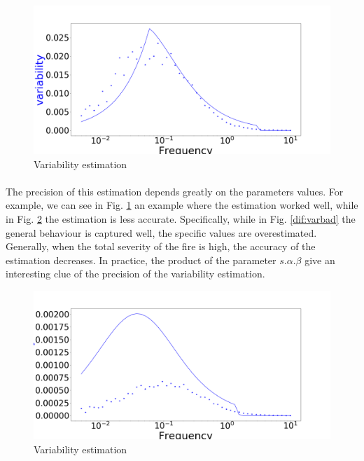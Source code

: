 \documentclass{article}
\begin{document}
\begin{figure}[h!]
\centering
\includegraphics[width=10.cm]{variability_good.png}
\caption{Variability estimation
\label{fig:vargood}
}
\end{figure}

\paragraph{}
The precision of this estimation depends greatly on the parameters values. For example, we can see in Fig. \ref{fig:vargood} an example where the estimation worked well, while in Fig. \ref{fig:varbad} the estimation is less accurate. Specifically, while in Fig. \ref{dif:varbad} the general behaviour is captured well, the specific values are overestimated.
Generally, when the total severity of the fire is high, the accuracy of the estimation decreases. In practice, the product of the parameter $s.\alpha.\beta$ give an interesting clue of the precision of the variability estimation.

\begin{figure}[h!]
\centering
\includegraphics[width=10.cm]{variability_bad.png}
\caption{Variability estimation
\label{fig:varbad}
}
\end{figure}
\end{document}

